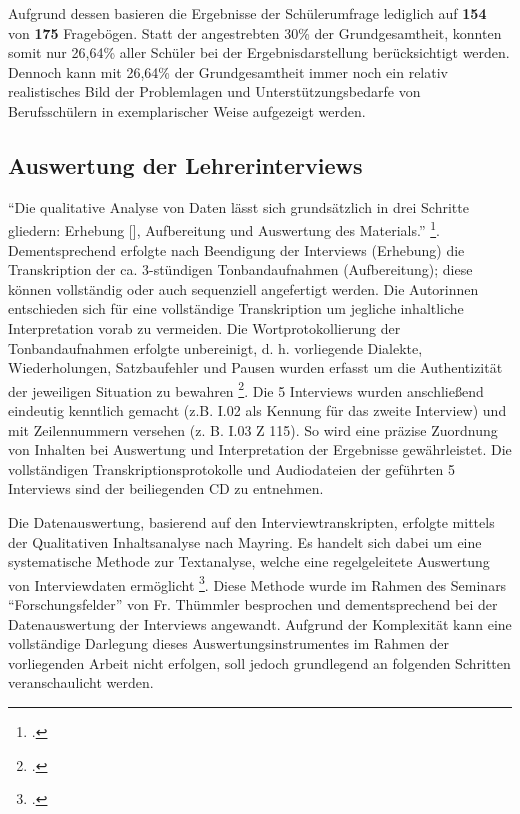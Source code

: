 Aufgrund dessen basieren die Ergebnisse der Schülerumfrage lediglich auf \textbf{154} von \textbf{175} Fragebögen. Statt der angestrebten 30\% der Grundgesamtheit, konnten somit nur 26,64\% aller Schüler bei der Ergebnisdarstellung berücksichtigt werden. Dennoch kann mit 26,64\% der Grundgesamtheit immer noch ein relativ realistisches Bild der Problemlagen und Unterstützungsbedarfe von Berufsschülern in exemplarischer Weise aufgezeigt werden.

\subsection{Auswertung der Lehrerinterviews}
\label{sec:AuswertungDerLehrerinterviews}

"`Die qualitative Analyse von Daten lässt sich grundsätzlich in drei Schritte gliedern: Erhebung [\punkte], Aufbereitung und Auswertung des Materials."' \footcite[135]{Krueger2014}. Dementsprechend erfolgte nach Beendigung der Interviews (Erhebung) die Transkription der ca. 3-stündigen Tonbandaufnahmen (Aufbereitung); diese können vollständig oder auch sequenziell angefertigt werden. Die Autorinnen entschieden sich für eine vollständige Transkription um jegliche inhaltliche Interpretation vorab zu vermeiden. Die Wortprotokollierung der Tonbandaufnahmen erfolgte unbereinigt, d. h. vorliegende Dialekte, Wiederholungen, Satzbaufehler und Pausen wurden erfasst um die Authentizität der jeweiligen Situation zu bewahren \footcite[vgl.][136]{Krueger2014}. Die 5 Interviews wurden anschließend eindeutig kenntlich gemacht (z.B. I.02 als Kennung für das zweite Interview) und mit Zeilennummern versehen (z. B. I.03 Z 115). So wird eine präzise Zuordnung von Inhalten bei Auswertung und Interpretation der Ergebnisse gewährleistet. Die vollständigen Transkriptionsprotokolle und Audiodateien der geführten 5 Interviews sind der beiliegenden CD zu entnehmen.

Die Datenauswertung, basierend auf den Interviewtranskripten, erfolgte mittels der Qualitativen Inhaltsanalyse nach Mayring. Es handelt sich dabei um eine systematische Methode zur Textanalyse, welche eine regelgeleitete Auswertung von Interviewdaten ermöglicht \footcite[vgl.][133]{Krueger2014}. Diese Methode wurde im Rahmen des Seminars "`Forschungsfelder"' von Fr. Thümmler besprochen und dementsprechend bei der Datenauswertung der Interviews angewandt. Aufgrund der Komplexität kann eine vollständige Darlegung dieses Auswertungsinstrumentes im Rahmen der vorliegenden Arbeit nicht erfolgen, soll jedoch grundlegend an folgenden Schritten veranschaulicht werden.

